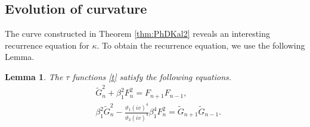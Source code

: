 \documentclass[10pt,leqno]{amsart}
\newtheorem{lem}[theorem]{Lemma}
\numberwithin{equation}{section}
\begin{document}
\subsection{Evolution of curvature}\label{subsection:Evolution of curvature}
The curve constructed in Theorem \ref{thm:PhDKal2} reveals an interesting recurrence equation for $\kappa$. To obtain the recurrence equation, we use the following Lemma.
\begin{lem}\label{prop:kappa_difference1}
    The $\tau$ functions \eqref{t} satisfy the following equations.
\begin{align}
&\widetilde{G}_{n}^{2}+\beta_{1}^2 F_{n}^{2}=F_{n+1}F_{n-1},\label{2i3}\\
&\beta_{1}^2\widetilde{G}_{n}^{2}-\frac{\vartheta_1\left(iv\right)^4}{\vartheta_3\left(iv\right)^4}\beta_{1}^4 F_{n}^{2}=\widetilde{G}_{n+1}\widetilde{G}_{n-1}.\label{eqn:kappa_difference1}
\end{align}
\end{lem}
\end{document}

